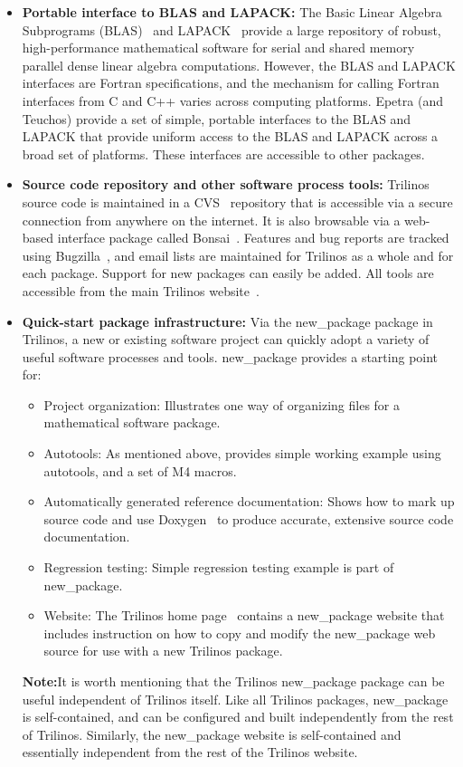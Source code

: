 \documentclass[12pt,relax]{TrilinosOverview}
\begin{document}
\begin{itemize}
\item {\bf Portable interface to BLAS and LAPACK:} The Basic Linear Algebra
Subprograms (BLAS)~\cite{BLAS1,BLAS2,BLAS3} and LAPACK~\cite{lapack}
provide a large repository of robust, high-performance mathematical
software for serial and shared memory parallel dense linear algebra
computations.  However, the BLAS and LAPACK interfaces are Fortran
specifications, and the mechanism for calling Fortran interfaces from
C and C++ varies across computing platforms.  Epetra (and Teuchos)
provide a set of simple, portable interfaces to the BLAS and LAPACK
that provide uniform access to the BLAS and LAPACK across a broad
set of platforms.  These interfaces are accessible to
other packages.

\item {\bf Source code repository and other software process tools:}
Trilinos source code is
maintained in a CVS~\cite{CVS} repository that is accessible via a
secure connection from anywhere on the internet.  It is also browsable
via a web-based interface package called Bonsai~\cite{Bonsai}.  Features 
and bug reports are tracked using Bugzilla~\cite{Bugzilla}, and email 
lists are
maintained for Trilinos as a whole and for each package.  Support for new
packages can easily be added.  All tools are accessible from the main
Trilinos website~\cite{Trilinos-home-page}.

\item {\bf Quick-start package infrastructure:} Via the new\_package package in
Trilinos, a new or existing software project can quickly adopt a
variety of useful software processes and tools.  new\_package provides a
starting point for:
\begin{itemize}
\item Project organization:  Illustrates one way of
organizing files for a mathematical software package.
\item Autotools: As mentioned above, provides simple working example
using autotools, and a set of M4 macros.
\item Automatically generated reference documentation: Shows how
to mark up source code and use Doxygen~\cite{Doxygen} to produce
accurate, extensive source code documentation.
\item Regression testing: Simple regression testing example is part of
new\_package.
\item Website: The Trilinos home page~\cite{Trilinos-home-page}
contains a new\_package website that includes instruction on how to
copy and modify the new\_package web source for use with a new
Trilinos package.
\end{itemize}

{\bf Note:}It is worth mentioning that the Trilinos new\_package package can be
useful independent of Trilinos itself.  Like all Trilinos packages,
new\_package is self-contained, and can be configured and
built independently from the rest of Trilinos.  Similarly, the
new\_package website is self-contained and essentially independent
from the rest of the Trilinos website.
\end{itemize}
\end{document}
